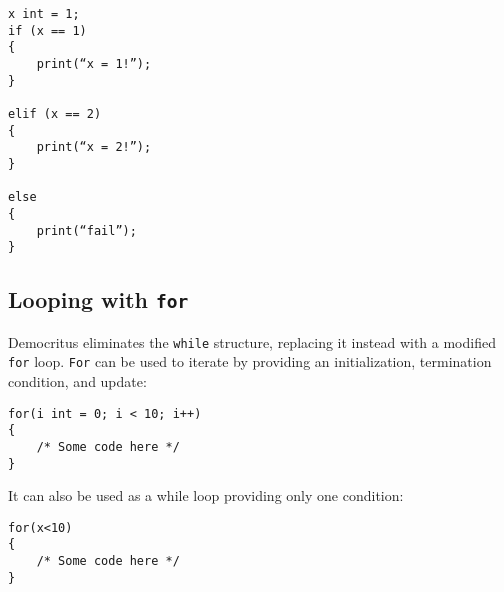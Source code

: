             \begin{lstlisting}
x int = 1;
if (x == 1)
{
    print(“x = 1!”);
}

elif (x == 2)
{
    print(“x = 2!”);
}

else 
{
    print(“fail”);
}
            \end{lstlisting}

        \subsection{Looping with \texttt{for}}
            Democritus eliminates the \texttt{while} structure, replacing it instead with a modified \texttt{for} loop. \texttt{For} can be used to iterate by providing an initialization, termination condition, and update:
            \begin{lstlisting}
for(i int = 0; i < 10; i++)
{
    /* Some code here */
}
            \end{lstlisting}

            It can also be used as a while loop providing only one condition:

            \begin{lstlisting}
for(x<10)
{
    /* Some code here */
}
            \end{lstlisting}


